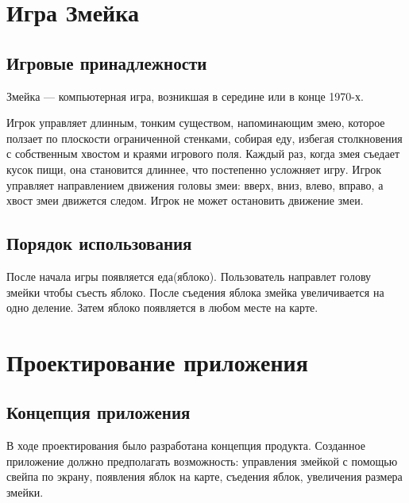 

	
	
	
	
	\tableofcontents
	\newpage
	
	
	
	\section{Игра Змейка}
	
	\subsection{Игровые принадлежности}
	
	Змейка — компьютерная игра, возникшая в середине или в конце 1970-х.
	
	Игрок управляет длинным, тонким существом, напоминающим змею, которое ползает по плоскости ограниченной стенками, собирая еду, избегая столкновения с собственным хвостом и краями игрового поля. Каждый раз, когда змея съедает кусок пищи, она становится длиннее, что постепенно усложняет игру. Игрок управляет направлением движения головы змеи: вверх, вниз, влево, вправо, а хвост змеи движется следом. Игрок не может остановить движение змеи.
	
	\subsection{Порядок использования}
	
	После начала игры появляется еда(яблоко). Пользователь направлет голову змейки чтобы съесть яблоко. После съедения яблока змейка увеличивается на одно деление. Затем яблоко появляется в любом месте на карте.
	
	\section{Проектирование приложения}
	
	\subsection{Концепция приложения} 
	
	В ходе проектирования было разработана концепция продукта.
	Созданное приложение должно предполагать возможность: управления змейкой с помощью свейпа по экрану, появления яблок на карте, съедения яблок, увеличения размера змейки. 
	
